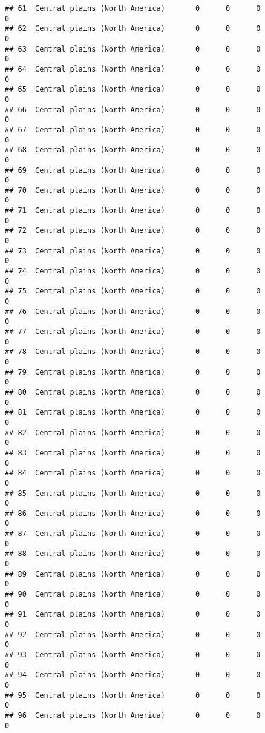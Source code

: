 \documentclass[]{article}
\begin{document}
\begin{verbatim}
## 61  Central plains (North America)       0      0      0             0
## 62  Central plains (North America)       0      0      0             0
## 63  Central plains (North America)       0      0      0             0
## 64  Central plains (North America)       0      0      0             0
## 65  Central plains (North America)       0      0      0             0
## 66  Central plains (North America)       0      0      0             0
## 67  Central plains (North America)       0      0      0             0
## 68  Central plains (North America)       0      0      0             0
## 69  Central plains (North America)       0      0      0             0
## 70  Central plains (North America)       0      0      0             0
## 71  Central plains (North America)       0      0      0             0
## 72  Central plains (North America)       0      0      0             0
## 73  Central plains (North America)       0      0      0             0
## 74  Central plains (North America)       0      0      0             0
## 75  Central plains (North America)       0      0      0             0
## 76  Central plains (North America)       0      0      0             0
## 77  Central plains (North America)       0      0      0             0
## 78  Central plains (North America)       0      0      0             0
## 79  Central plains (North America)       0      0      0             0
## 80  Central plains (North America)       0      0      0             0
## 81  Central plains (North America)       0      0      0             0
## 82  Central plains (North America)       0      0      0             0
## 83  Central plains (North America)       0      0      0             0
## 84  Central plains (North America)       0      0      0             0
## 85  Central plains (North America)       0      0      0             0
## 86  Central plains (North America)       0      0      0             0
## 87  Central plains (North America)       0      0      0             0
## 88  Central plains (North America)       0      0      0             0
## 89  Central plains (North America)       0      0      0             0
## 90  Central plains (North America)       0      0      0             0
## 91  Central plains (North America)       0      0      0             0
## 92  Central plains (North America)       0      0      0             0
## 93  Central plains (North America)       0      0      0             0
## 94  Central plains (North America)       0      0      0             0
## 95  Central plains (North America)       0      0      0             0
## 96  Central plains (North America)       0      0      0             0

\end{verbatim}
\end{document}
